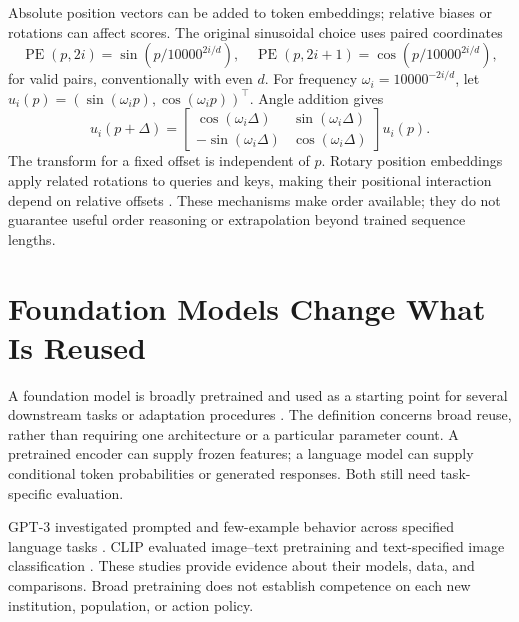 Absolute position vectors can be added to token embeddings; relative biases or rotations can affect scores. The original sinusoidal choice uses paired coordinates
\[
\operatorname{PE}(p,2i)=\sin(p/10000^{2i/d}),\quad
\operatorname{PE}(p,2i+1)=\cos(p/10000^{2i/d}),
\]
for valid pairs, conventionally with even $d$. For frequency $\omega_i=10000^{-2i/d}$, let $u_i(p)=(\sin(\omega_i p),\cos(\omega_i p))^\top$. Angle addition gives
\[
u_i(p+\Delta)=
\begin{bmatrix}
\cos(\omega_i\Delta)&\sin(\omega_i\Delta)\\
-\sin(\omega_i\Delta)&\cos(\omega_i\Delta)
\end{bmatrix}u_i(p).
\]
The transform for a fixed offset is independent of $p$. Rotary position embeddings apply related rotations to queries and keys, making their positional interaction depend on relative offsets \citep{su2021roformer}. These mechanisms make order available; they do not guarantee useful order reasoning or extrapolation beyond trained sequence lengths.

\section{Foundation Models Change What Is Reused}

A foundation model is broadly pretrained and used as a starting point for several downstream tasks or adaptation procedures \citep{bommasani2021}. The definition concerns broad reuse, rather than requiring one architecture or a particular parameter count. A pretrained encoder can supply frozen features; a language model can supply conditional token probabilities or generated responses. Both still need task-specific evaluation.

GPT-3 investigated prompted and few-example behavior across specified language tasks \citep{brown2020}. CLIP evaluated image--text pretraining and text-specified image classification \citep{radford2021clip}. These studies provide evidence about their models, data, and comparisons. Broad pretraining does not establish competence on each new institution, population, or action policy.

